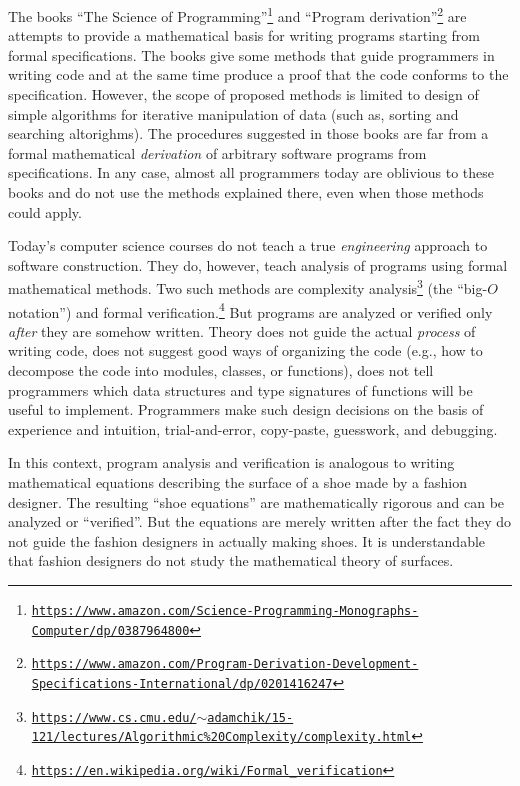 The books \textsf{``}The Science of Programming\textsf{''}\footnote{\texttt{\href{https://www.amazon.com/Science-Programming-Monographs-Computer/dp/0387964800}{https://www.amazon.com/Science-Programming-Monographs-Computer/dp/0387964800}}}
and \textsf{``}Program derivation\textsf{''}\footnote{\texttt{\href{https://www.amazon.com/Program-Derivation-Development-Specifications-International/dp/0201416247}{https://www.amazon.com/Program-Derivation-Development-Specifications-International/dp/0201416247}}}
are attempts to provide a mathematical basis for writing programs
starting from formal specifications. The books give some methods that
guide programmers in writing code and at the same time produce a proof
that the code conforms to the specification. However, the scope of
proposed methods is limited to design of simple algorithms for iterative
manipulation of data (such as, sorting and searching altorighms).
The procedures suggested in those books are far from a formal mathematical
\emph{derivation} of arbitrary software programs from specifications.
In any case, almost all programmers today are oblivious to these books
and do not use the methods explained there, even when those methods
could apply.

Today\textsf{'}s computer science courses do not teach a true \emph{engineering}
approach to software construction. They do, however, teach analysis
of programs using formal mathematical methods. Two such methods are
complexity analysis\footnote{\texttt{\href{https://www.cs.cmu.edu/~adamchik/15-121/lectures/Algorithmic\%20Complexity/complexity.html}{https://www.cs.cmu.edu/$\sim$adamchik/15-121/lectures/Algorithmic\%20Complexity/complexity.html}}}
(the \textsf{``}big-$O$ notation\textsf{''}) and formal verification.\footnote{\texttt{\href{https://en.wikipedia.org/wiki/Formal_verification}{https://en.wikipedia.org/wiki/Formal\_verification}}}
But programs are analyzed or verified only \emph{after} they are somehow
written. Theory does not guide the actual \emph{process} of writing
code, does not suggest good ways of organizing the code (e.g., how
to decompose the code into modules, classes, or functions), does not
tell programmers which data structures and type signatures of functions
will be useful to implement. Programmers make such design decisions
on the basis of experience and intuition, trial-and-error, copy-paste,
guesswork, and debugging. 

In this context, program analysis and verification is analogous to
writing mathematical equations describing the surface of a shoe made
by a fashion designer. The resulting \textsf{``}shoe equations\textsf{''} are mathematically
rigorous and can be analyzed or \textsf{``}verified\textsf{''}. But the equations
are merely written after the fact \textemdash{} they do not guide
the fashion designers in actually making shoes. It is understandable
that fashion designers do not study the mathematical theory of surfaces.

